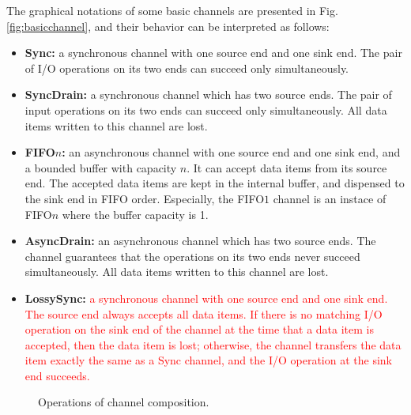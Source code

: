 \documentclass{llncs}
\newcommand{\redt}[1]{\textcolor{red}{#1}}
\begin{document}
The graphical notations of some basic channels are presented in Fig. \ref{fig:basicchannel}, and their behavior can be interpreted as follows:
\begin{itemize}
\item{\textbf{Sync:} a synchronous channel with one source end and one sink end. The pair of I/O operations on its two ends can succeed only simultaneously.}
\item{\textbf{SyncDrain:} a synchronous channel which has two source ends.
 The pair of input operations on its two ends can succeed only simultaneously.
 All data items written to this channel are lost.}
\item{\textbf{FIFO$n$:} an asynchronous channel with one source end and one sink end, and a bounded buffer with capacity $n$.
It can accept data items from its source end. The accepted data items are kept in the internal buffer, and dispensed to
the sink end in FIFO order.
Especially, the FIFO$1$ channel is an instace of FIFO$n$ where the buffer capacity is 1.}
\item{\textbf{AsyncDrain:}  an asynchronous channel} which has two source ends. The channel guarantees that the operations on its two ends never succeed simultaneously. All data items written to this channel are lost.
\item{\textbf{LossySync:} \redt{a synchronous channel with one source end and one sink end. The source end always accepts all data items. If there is no matching I/O operation on the sink end of the channel at the time that a data item is accepted, then the data item is lost; otherwise, the channel transfers the data item exactly the same as a Sync channel, and the I/O operation at the sink end succeeds.}}
\end{itemize}

\begin{figure}
\centering
{}
\caption{Operations of channel composition.}\label{fig:channelcomposition}
\end{figure}
\end{document}
